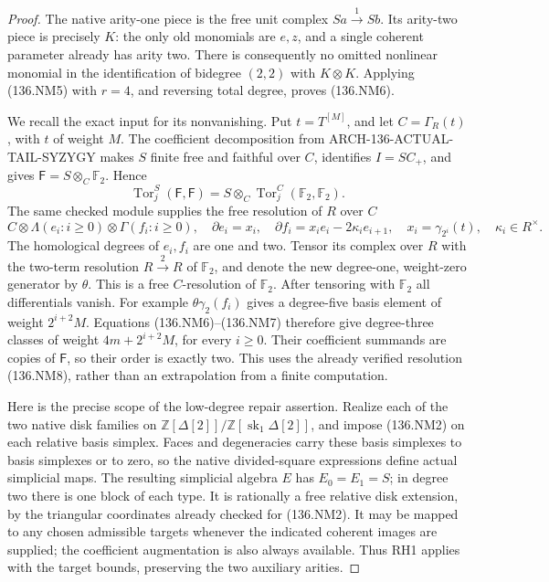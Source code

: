 \begin{proof}
The native arity-one piece is the free unit complex
\(Sa\xrightarrow{1}Sb\). Its arity-two piece is precisely
\(K\): the only old monomials are \(e,z\), and a single
coherent parameter already has arity two. There is consequently
no omitted nonlinear monomial in the identification of
bidegree \((2,2)\) with \(K\otimes K\). Applying (136.NM5)
with \(r=4\), and reversing total degree, proves (136.NM6).

We recall the exact input for its nonvanishing.
Put \(t=T^{[M]}\), and let \(C=\Gamma_R(t)\), with
\(t\) of weight \(M\). The coefficient decomposition from
ARCH-136-ACTUAL-TAIL-SYZYGY makes \(S\) finite free and
faithful over \(C\), identifies \(I=SC_+\), and gives
\(\mathsf F=S\otimes_C\mathbb F_2\). Hence
\[
 \operatorname{Tor}_j^S(\mathsf F,\mathsf F)
       =S\otimes_C\operatorname{Tor}_j^C(\mathbb F_2,\mathbb F_2).
                                                               \tag{136.NM7}
\]
The same checked module supplies the free resolution of \(R\)
over \(C\)
\[
 C\otimes\Lambda(e_i:i\geq0)\otimes\Gamma(f_i:i\geq0),
 \quad \partial e_i=x_i,\quad
 \partial f_i=x_i e_i-2\kappa_i e_{i+1},
 \quad x_i=\gamma_{2^i}(t),\quad\kappa_i\in R^\times.
                                                               \tag{136.NM8}
\]
The homological degrees of \(e_i,f_i\) are one and two.
Tensor its complex over \(R\) with the two-term resolution
\(R\xrightarrow{2}R\) of \(\mathbb F_2\), and denote
the new degree-one, weight-zero generator by \(\theta\).
This is a free \(C\)-resolution of \(\mathbb F_2\).
After tensoring with \(\mathbb F_2\) all differentials vanish.
For example
\(\theta\gamma_2(f_i)\) gives a degree-five basis element
of weight \(2^{i+2}M\). Equations (136.NM6)--(136.NM7)
therefore give degree-three classes of weight
\(4m+2^{i+2}M\), for every \(i\geq0\). Their coefficient
summands are copies of \(\mathsf F\), so their order is exactly two.
This uses the already verified resolution (136.NM8), rather
than an extrapolation from a finite computation.

Here is the precise scope of the low-degree repair assertion.
Realize each of the two native disk families on
\(\mathbb Z[\Delta[2]]/\mathbb Z[\operatorname{sk}_1\Delta[2]]\),
and impose (136.NM2) on each relative basis simplex. Faces
and degeneracies carry these basis simplexes to basis simplexes
or to zero, so the native divided-square expressions define
actual simplicial maps. The resulting simplicial algebra \(E\)
has \(E_0=E_1=S\); in degree two there is one block of each
type. It is rationally a free relative disk extension, by the
triangular coordinates already checked for (136.NM2).
It may be mapped to any chosen admissible targets whenever
the indicated coherent images are supplied; the coefficient
augmentation is also always available. Thus RH1 applies with
the target bounds, preserving the two auxiliary arities.


\end{proof}
